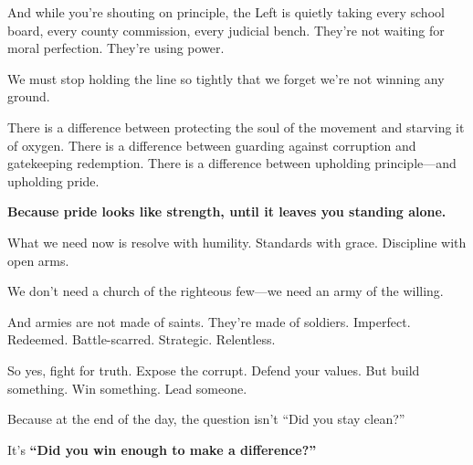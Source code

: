 And while you're shouting on principle, the Left is quietly taking every school board, every county commission, every judicial bench. They’re not waiting for moral perfection. They're using power.

We must stop holding the line so tightly that we forget we’re not winning any ground.

There is a difference between protecting the soul of the movement and starving it of oxygen. There is a difference between guarding against corruption and gatekeeping redemption. There is a difference between upholding principle—and upholding pride.

\textbf{Because pride looks like strength, until it leaves you standing alone.}

What we need now is resolve with humility. Standards with grace. Discipline with open arms.

We don’t need a church of the righteous few—we need an army of the willing.

And armies are not made of saints. They're made of soldiers. Imperfect. Redeemed. Battle-scarred. Strategic. Relentless.

So yes, fight for truth. Expose the corrupt. Defend your values. But build something. Win something. Lead someone.

Because at the end of the day, the question isn’t ``Did you stay clean?''

It’s \textbf{``Did you win enough to make a difference?''}
